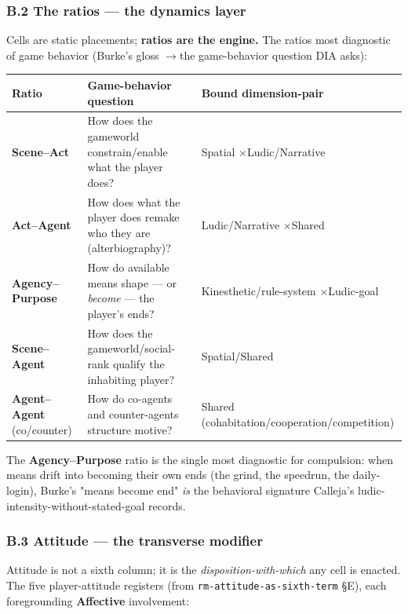 \documentclass[11pt]{report}
\begin{document}
\subsubsection{B.2 The ratios — the dynamics layer}


Cells are static placements; \textbf{ratios are the engine.} The ratios most diagnostic of game behavior (Burke's gloss $\rightarrow$\allowbreak  the game-behavior question DIA asks):


\begin{table}[H]
\renewcommand{\arraystretch}{1.25}
\begin{tabularx}{\textwidth}{>{\RaggedRight\arraybackslash}X>{\RaggedRight\arraybackslash}X>{\RaggedRight\arraybackslash}X}
\toprule
Ratio & Game-behavior question & Bound dimension-pair \\
\midrule
\textbf{Scene–Act} & How does the gameworld constrain/enable what the player does? & Spatial $\times$\allowbreak  Ludic/Narrative \\
\textbf{Act–Agent} & How does what the player does remake who they are (alterbiography)? & Ludic/Narrative $\times$\allowbreak  Shared \\
\textbf{Agency–Purpose} & How do available means shape — or \textit{become} — the player's ends? & Kinesthetic/rule-system $\times$\allowbreak  Ludic-goal \\
\textbf{Scene–Agent} & How does the gameworld/social-rank qualify the inhabiting player? & Spatial/Shared \\
\textbf{Agent–Agent} (co/counter) & How do co-agents and counter-agents structure motive? & Shared (cohabitation/cooperation/competition) \\
\bottomrule
\end{tabularx}
\end{table}


The \textbf{Agency–Purpose} ratio is the single most diagnostic for compulsion: when means drift into becoming their own ends (the grind, the speedrun, the daily-login), Burke's "means become end" \textit{is} the behavioral signature Calleja's ludic-intensity-without-stated-goal records.


\subsubsection{B.3 Attitude — the transverse modifier}


Attitude is not a sixth column; it is the \textit{disposition-with-which} any cell is enacted. The five player-attitude registers (from \texttt{rm-\discretionary{}{}{}attitude-\discretionary{}{}{}as-\discretionary{}{}{}sixth-\discretionary{}{}{}term} §E), each foregrounding \textbf{Affective} involvement:
\end{document}
